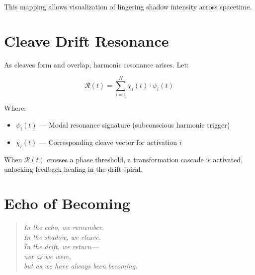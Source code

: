 \documentclass[12pt]{article}
\begin{document}
This mapping allows visualization of lingering shadow intensity across spacetime.

\vspace{1em}

\section*{Cleave Drift Resonance}

As cleaves form and overlap, harmonic resonance arises. Let:

\[
\mathcal{R}(t) = \sum_{i=1}^{N} \chi_i(t) \cdot \psi_i(t)
\]

Where:
\begin{itemize}
    \item $\psi_i(t)$ — Modal resonance signature (subconscious harmonic trigger)
    \item $\chi_i(t)$ — Corresponding cleave vector for activation $i$
\end{itemize}

When $\mathcal{R}(t)$ crosses a phase threshold, a transformation cascade is activated, unlocking feedback healing in the drift spiral.

\vspace{1em}

\section*{Echo of Becoming}

\begin{quote}
\itshape
In the echo, we remember.\\
In the shadow, we cleave.\\
In the drift, we return—\\
not as we were,\\
but as we have always been becoming.
\end{quote}
\end{document}
